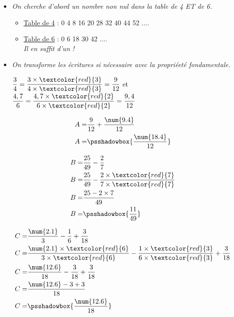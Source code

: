 \begin{changemargin}{0mm}{-15mm}
\begin{exemples*1}
      \medskip
      \begin{itemize}
      \item \textit{On cherche d'abord un nombre non nul dans la table de 4 ET de 6.}
      \begin{itemize}
      \item[] \underline{Table de 4} : 0 4 8  16 20  28 32  40 44  52  $\ldots$.
      \item[] \underline{Table de 6} : 0 6  18  30  42   $\ldots$.\\
      \textit{Il en suffit d'un !}
      \end{itemize}
      \item \textit{On transforme les écritures si nécessaire avec la propriéeté fondamentale.}
      
      \medskip
      $\dfrac{3}{4}=\dfrac{3\times \textcolor{red}{3}}{4\times \textcolor{red}{3}}=\dfrac{9}{12}$ et $\dfrac{4,7}{6}=\dfrac{4,7\times \textcolor{red}{2}}{6\times \textcolor{red}{2}}=\dfrac{9,4}{12}$
      \end{itemize}
      \begin{minipage}{0.3\linewidth}
         \begin{align*}
            A=&\dfrac{9}{12}+\dfrac{\num{9.4}}{12}\\
            A=&\psshadowbox{\dfrac{\num{18.4}}{12}}
         \end{align*}
      \end{minipage}
      \begin{minipage}{0.3\linewidth}
         \begin{align*}
            B=&\dfrac{25}{49}-\dfrac{2}{7}\\
            B=&\dfrac{25}{49}-\dfrac{2\times \textcolor{red}{7}}{7\times \textcolor{red}{7}}\\
            B=&\dfrac{25-2\times 7}{49}\\
            B=&\psshadowbox{\dfrac{11}{49}}
         \end{align*}
      \end{minipage}
      \begin{minipage}{0.3\linewidth}
         \begin{align*}
            C=&\dfrac{\num{2.1}}{3}-\dfrac{1}{6}+\dfrac{3}{18}\\
            C=&\dfrac{\num{2.1}\times \textcolor{red}{6}}{3\times \textcolor{red}{6}}-\dfrac{1\times \textcolor{red}{3}}{6\times \textcolor{red}{3}}+\dfrac{3}{18}\\
            C=&\dfrac{\num{12.6}}{18}-\dfrac{3}{18}+\dfrac{3}{18}\\
            C=&\dfrac{\num{12.6}-3+3}{18}\\
            C=&\psshadowbox{\dfrac{\num{12.6}}{18}}
         \end{align*}
      \end{minipage}
   \end{exemples*1}


\end{changemargin}
